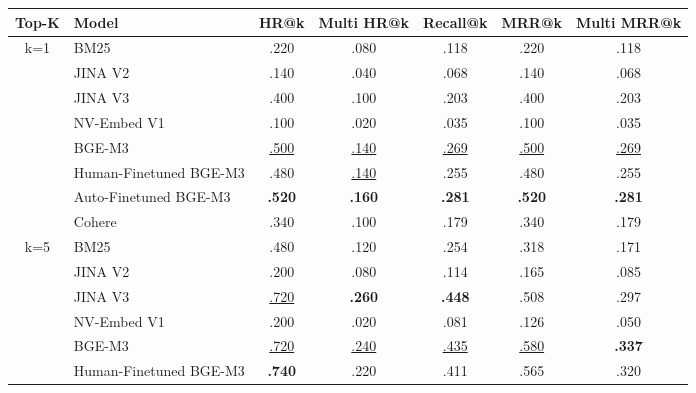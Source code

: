 \begin{table}[!ht]
\centering
\small
\begin{tabular}{@{}clccccc@{}}
\toprule
\textbf{Top-K} & \textbf{Model}                  & \textbf{HR@k}          & \textbf{Multi HR@k}    & \textbf{Recall@k}      & \textbf{MRR@k}         & \textbf{Multi MRR@k}   \\ \midrule
k=1   & BM25                   & .220          & .080          & .118          & .220          & .118          \\
      & JINA V2                & .140          & .040          & .068          & .140          & .068          \\
      & JINA V3                & .400          & .100          & .203          & .400          & .203          \\
      & NV-Embed V1            & .100          & .020          & .035          & .100          & .035          \\
      & BGE-M3                 & \underline{.500}    & \underline{.140}    & \underline{.269}    & \underline{.500}    & \underline{.269}    \\
      & Human-Finetuned BGE-M3 & .480          & \underline{.140}    & .255          & .480          & .255          \\
      & Auto-Finetuned BGE-M3  & \textbf{.520} & \textbf{.160} & \textbf{.281} & \textbf{.520} & \textbf{.281} \\
      & Cohere                 & .340          & .100          & .179          & .340          & .179          \\ \midrule
k=5   & BM25                   & .480          & .120          & .254          & .318          & .171          \\
      & JINA V2                & .200          & .080          & .114          & .165          & .085          \\
      & JINA V3                & \underline{.720}    & \textbf{.260} & \textbf{.448} & .508          & .297          \\
      & NV-Embed V1            & .200          & .020          & .081          & .126          & .050          \\
      & BGE-M3                 & \underline{.720}    & \underline{.240}    & \underline{.435}    & \underline{.580}    & \textbf{.337} \\
      & Human-Finetuned BGE-M3 & \textbf{.740} & .220          & .411          & .565          & .320          \\

\end{tabular}
\end{table}

